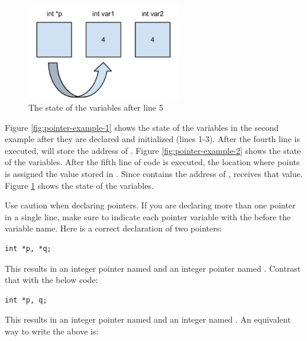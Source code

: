 \begin{figure}[tb]
  \centering
  \includegraphics[width=0.6\textwidth]{diagrams/pointer-example-3.pdf}
  \caption{The state of the variables after line 5} \label{fig:pointer-example-3} 
\end{figure}

Figure \ref{fig:pointer-example-1} shows the state of the variables in the second example after they are declared and initialized (lines 1-3).
After the fourth line is executed,  will store the address of . Figure \ref{fig:pointer-example-2} shows the state of the variables.
After the fifth line of code is executed, the location where  points is assigned the value stored in .
Since  contains the address of ,  receives that value. Figure \ref{fig:pointer-example-3} shows the state of the variables.

Use caution when declaring pointers.
If you are declaring more than one pointer in a single line, make sure to indicate each pointer variable with the \Code{*} before the variable name.  
Here is a correct declaration of two pointers:

\noindent\begin{minipage}{\linewidth}\begin{lstlisting}
int *p, *q;
\end{lstlisting}\end{minipage}

This results in an integer pointer named  and an integer pointer named . 
Contrast that with the below code:

\noindent\begin{minipage}{\linewidth}\begin{lstlisting}
int *p, q;
\end{lstlisting}\end{minipage}

This results in an integer pointer named  and an integer named . 
An equivalent way to write the above is: \nopagebreak[4]

